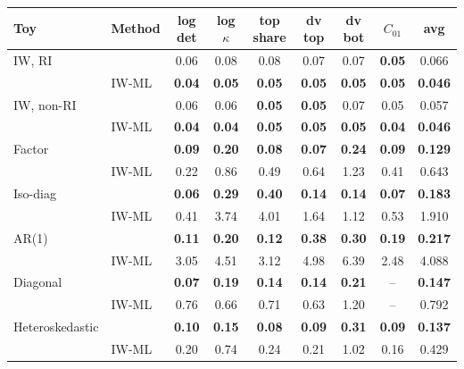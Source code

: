 \begin{tabular}{llccccccc}
    \toprule
    Toy & Method & log det & log $\kappa$ & top share & dv top & dv bot & $C_{01}$ & avg \\
    \midrule
    IW, RI & \scsi{} & 0.06 & 0.08 & 0.08 & 0.07 & 0.07 & \textbf{0.05} & 0.066 \\
     & IW-ML & \textbf{0.04} & \textbf{0.05} & \textbf{0.05} & \textbf{0.05} & \textbf{0.05} & \textbf{0.05} & \textbf{0.046} \\
    \midrule
    IW, non-RI & \scsi{} & 0.06 & 0.06 & \textbf{0.05} & \textbf{0.05} & 0.07 & 0.05 & 0.057 \\
     & IW-ML & \textbf{0.04} & \textbf{0.04} & \textbf{0.05} & \textbf{0.05} & \textbf{0.05} & \textbf{0.04} & \textbf{0.046} \\
    \midrule
    Factor & \scsi{} & \textbf{0.09} & \textbf{0.20} & \textbf{0.08} & \textbf{0.07} & \textbf{0.24} & \textbf{0.09} & \textbf{0.129} \\
     & IW-ML & 0.22 & 0.86 & 0.49 & 0.64 & 1.23 & 0.41 & 0.643 \\
    \midrule
    Iso-diag & \scsi{} & \textbf{0.06} & \textbf{0.29} & \textbf{0.40} & \textbf{0.14} & \textbf{0.14} & \textbf{0.07} & \textbf{0.183} \\
     & IW-ML & 0.41 & 3.74 & 4.01 & 1.64 & 1.12 & 0.53 & 1.910 \\
    \midrule
    AR(1) & \scsi{} & \textbf{0.11} & \textbf{0.20} & \textbf{0.12} & \textbf{0.38} & \textbf{0.30} & \textbf{0.19} & \textbf{0.217} \\
     & IW-ML & 3.05 & 4.51 & 3.12 & 4.98 & 6.39 & 2.48 & 4.088 \\
    \midrule
    Diagonal & \scsi{} & \textbf{0.07} & \textbf{0.19} & \textbf{0.14} & \textbf{0.14} & \textbf{0.21} & -- & \textbf{0.147} \\
     & IW-ML & 0.76 & 0.66 & 0.71 & 0.63 & 1.20 & -- & 0.792 \\
    \midrule
    Heteroskedastic & \scsi{} & \textbf{0.10} & \textbf{0.15} & \textbf{0.08} & \textbf{0.09} & \textbf{0.31} & \textbf{0.09} & \textbf{0.137} \\
     & IW-ML & 0.20 & 0.74 & 0.24 & 0.21 & 1.02 & 0.16 & 0.429 \\
    \bottomrule
\end{tabular}
